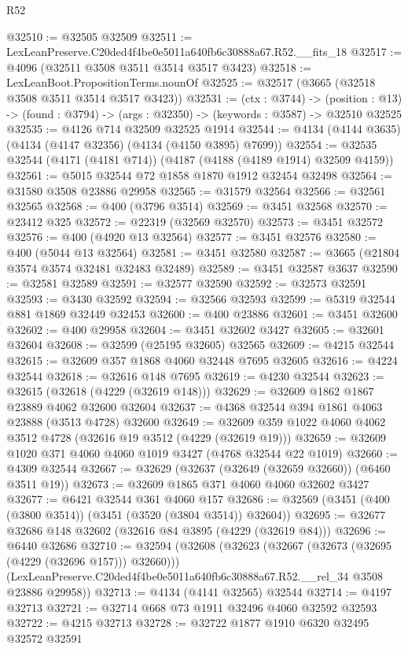 \begin{lexlean}{R52}
\begin{coremodule}
@32510 := @32505 @32509
@32511 := LexLeanPreserve.C20ded4f4be0e5011a640fb6c30888a67.R52.__fits_18
@32517 := @4096 (@32511 @3508 @3511 @3514 @3517 @3423)
@32518 := LexLeanBoot.PropositionTerms.nounOf
@32525 := @32517 (@3665 (@32518 @3508 @3511 @3514 @3517 @3423))
@32531 := (ctx : @3744) ->
  (position : @13) -> (found : @3794) -> (args : @32350) -> (keywords : @3587) -> @32510 @32525
@32535 := @4126 @714 @32509 @32525 @1914
@32544 := @4134 (@4144 @3635) (@4134 (@4147 @32356) (@4134 (@4150 @3895) @7699))
@32554 := @32535 @32544 (@4171 (@4181 @714)) (@4187 (@4188 (@4189 @1914) @32509 @4159))
@32561 := @5015 @32544 @72 @1858 @1870 @1912 @32454 @32498
@32564 := @31580 @3508 @23886 @29958
@32565 := @31579 @32564
@32566 := @32561 @32565
@32568 := @400 (@3796 @3514)
@32569 := @3451 @32568
@32570 := @23412 @325
@32572 := @22319 (@32569 @32570)
@32573 := @3451 @32572
@32576 := @400 (@4920 @13 @32564)
@32577 := @3451 @32576
@32580 := @400 (@5044 @13 @32564)
@32581 := @3451 @32580
@32587 := @3665 (@21804 @3574 @3574 @32481 @32483 @32489)
@32589 := @3451 @32587 @3637
@32590 := @32581 @32589
@32591 := @32577 @32590
@32592 := @32573 @32591
@32593 := @3430 @32592
@32594 := @32566 @32593
@32599 := @5319 @32544 @881 @1869 @32449 @32453
@32600 := @400 @23886
@32601 := @3451 @32600
@32602 := @400 @29958
@32604 := @3451 @32602 @3427
@32605 := @32601 @32604
@32608 := @32599 (@25195 @32605) @32565
@32609 := @4215 @32544
@32615 := @32609 @357 @1868 @4060 @32448 @7695 @32605
@32616 := @4224 @32544
@32618 := @32616 @148 @7695
@32619 := @4230 @32544
@32623 := @32615 (@32618 (@4229 (@32619 @148)))
@32629 := @32609 @1862 @1867 @23889 @4062 @32600 @32604
@32637 := @4368 @32544 @394 @1861 @4063 @23888 (@3513 @4728) @32600
@32649 := @32609 @359 @1022 @4060 @4062 @3512 @4728 (@32616 @19 @3512 (@4229 (@32619 @19)))
@32659 := @32609 @1020 @371 @4060 @4060 @1019 @3427 (@4768 @32544 @22 @1019)
@32660 := @4309 @32544
@32667 := @32629 (@32637 (@32649 (@32659 @32660)) (@6460 @3511 @19))
@32673 := @32609 @1865 @371 @4060 @4060 @32602 @3427
@32677 := @6421 @32544 @361 @4060 @157
@32686 := @32569 (@3451 (@400 (@3800 @3514)) (@3451 (@3520 (@3804 @3514)) @32604))
@32695 := @32677 @32686 @148 @32602 (@32616 @84 @3895 (@4229 (@32619 @84)))
@32696 := @6440 @32686
@32710 := @32594
    (@32608
      (@32623 (@32667 (@32673 (@32695 (@4229 (@32696 @157))) @32660)))
      (LexLeanPreserve.C20ded4f4be0e5011a640fb6c30888a67.R52.__rel_34 @3508 @23886 @29958))
@32713 := @4134 (@4141 @32565) @32544
@32714 := @4197 @32713
@32721 := @32714 @668 @73 @1911 @32496 @4060 @32592 @32593
@32722 := @4215 @32713
@32728 := @32722 @1877 @1910 @6320 @32495 @32572 @32591

\end{coremodule}
\end{lexlean}
